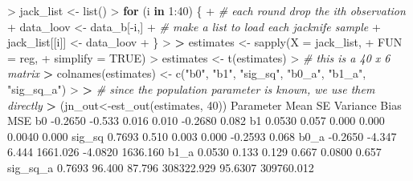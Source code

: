 \documentclass[
]{article}
\newenvironment{Shaded}{\begin{snugshade}}{\end{snugshade}}
\newcommand{\AttributeTok}[1]{\textcolor[rgb]{0.77,0.63,0.00}{#1}}
\newcommand{\CommentTok}[1]{\textcolor[rgb]{0.56,0.35,0.01}{\textit{#1}}}
\newcommand{\ConstantTok}[1]{\textcolor[rgb]{0.00,0.00,0.00}{#1}}
\newcommand{\ControlFlowTok}[1]{\textcolor[rgb]{0.13,0.29,0.53}{\textbf{#1}}}
\newcommand{\DecValTok}[1]{\textcolor[rgb]{0.00,0.00,0.81}{#1}}
\newcommand{\ErrorTok}[1]{\textcolor[rgb]{0.64,0.00,0.00}{\textbf{#1}}}
\newcommand{\FloatTok}[1]{\textcolor[rgb]{0.00,0.00,0.81}{#1}}
\newcommand{\FunctionTok}[1]{\textcolor[rgb]{0.00,0.00,0.00}{#1}}
\newcommand{\NormalTok}[1]{#1}
\newcommand{\OtherTok}[1]{\textcolor[rgb]{0.56,0.35,0.01}{#1}}
\newcommand{\SpecialCharTok}[1]{\textcolor[rgb]{0.00,0.00,0.00}{#1}}
\newcommand{\StringTok}[1]{\textcolor[rgb]{0.31,0.60,0.02}{#1}}
\begin{document}
\begin{Shaded}
\begin{Highlighting}[]
\SpecialCharTok{\textgreater{}}\NormalTok{ jack\_list }\OtherTok{\textless{}{-}} \FunctionTok{list}\NormalTok{()}
\SpecialCharTok{\textgreater{}} \ControlFlowTok{for}\NormalTok{ (i }\ControlFlowTok{in} \DecValTok{1}\SpecialCharTok{:}\DecValTok{40}\NormalTok{) \{}
\SpecialCharTok{+}   \CommentTok{\# each round drop the ith observation}
\SpecialCharTok{+}\NormalTok{   data\_loov }\OtherTok{\textless{}{-}}\NormalTok{ data\_b[}\SpecialCharTok{{-}}\NormalTok{i,]}
\SpecialCharTok{+}   \CommentTok{\# make a list to load each jacknife sample}
\SpecialCharTok{+}\NormalTok{   jack\_list[[i]] }\OtherTok{\textless{}{-}}\NormalTok{ data\_loov}
\SpecialCharTok{+}\NormalTok{ \}}
\SpecialCharTok{\textgreater{}} 
\ErrorTok{\textgreater{}}\NormalTok{ estimates }\OtherTok{\textless{}{-}} \FunctionTok{sapply}\NormalTok{(}\AttributeTok{X =}\NormalTok{ jack\_list,}
\SpecialCharTok{+}                     \AttributeTok{FUN =}\NormalTok{ reg,}
\SpecialCharTok{+}                     \AttributeTok{simplify =} \ConstantTok{TRUE}\NormalTok{)}
\SpecialCharTok{\textgreater{}}\NormalTok{ estimates }\OtherTok{\textless{}{-}} \FunctionTok{t}\NormalTok{(estimates) }
\SpecialCharTok{\textgreater{}} \CommentTok{\# this is a 40 x 6 matrix}
\ErrorTok{\textgreater{}} \FunctionTok{colnames}\NormalTok{(estimates) }\OtherTok{\textless{}{-}} \FunctionTok{c}\NormalTok{(}\StringTok{"b0"}\NormalTok{, }\StringTok{"b1"}\NormalTok{, }\StringTok{"sig\_sq"}\NormalTok{, }\StringTok{"b0\_a"}\NormalTok{, }\StringTok{"b1\_a"}\NormalTok{, }\StringTok{"sig\_sq\_a"}\NormalTok{)}
\SpecialCharTok{\textgreater{}} 
\ErrorTok{\textgreater{}} \CommentTok{\# since the population parameter is known, we use them directly}
\ErrorTok{\textgreater{}}\NormalTok{ (jn\_out}\OtherTok{\textless{}{-}}\FunctionTok{est\_out}\NormalTok{(estimates, }\DecValTok{40}\NormalTok{))}
\NormalTok{         Parameter   Mean     SE   Variance    Bias        MSE}
\NormalTok{b0         }\SpecialCharTok{{-}}\FloatTok{0.2650} \SpecialCharTok{{-}}\FloatTok{0.533}  \FloatTok{0.016}      \FloatTok{0.010} \SpecialCharTok{{-}}\FloatTok{0.2680}      \FloatTok{0.082}
\NormalTok{b1          }\FloatTok{0.0530}  \FloatTok{0.057}  \FloatTok{0.000}      \FloatTok{0.000}  \FloatTok{0.0040}      \FloatTok{0.000}
\NormalTok{sig\_sq      }\FloatTok{0.7693}  \FloatTok{0.510}  \FloatTok{0.003}      \FloatTok{0.000} \SpecialCharTok{{-}}\FloatTok{0.2593}      \FloatTok{0.068}
\NormalTok{b0\_a       }\SpecialCharTok{{-}}\FloatTok{0.2650} \SpecialCharTok{{-}}\FloatTok{4.347}  \FloatTok{6.444}   \FloatTok{1661.026} \SpecialCharTok{{-}}\FloatTok{4.0820}   \FloatTok{1636.160}
\NormalTok{b1\_a        }\FloatTok{0.0530}  \FloatTok{0.133}  \FloatTok{0.129}      \FloatTok{0.667}  \FloatTok{0.0800}      \FloatTok{0.657}
\NormalTok{sig\_sq\_a    }\FloatTok{0.7693} \FloatTok{96.400} \FloatTok{87.796} \FloatTok{308322.929} \FloatTok{95.6307} \FloatTok{309760.012}
\end{Highlighting}
\end{Shaded}
\end{document}
